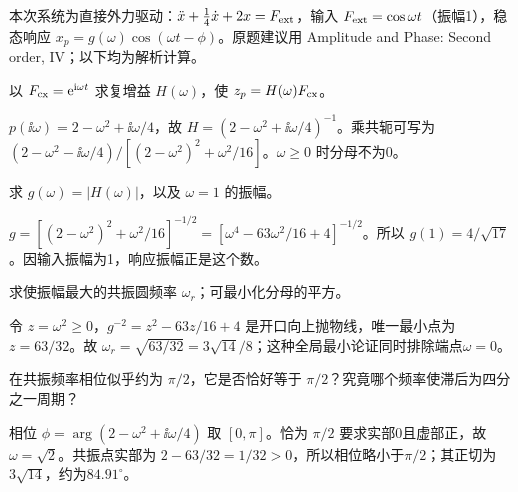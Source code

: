 本次系统为直接外力驱动：$\ddot x+\frac14\dot x+2x=F_{\rm ext}$，输入 $F_{\rm ext}=\cos\omega t$（振幅1），稳态响应 $x_p=g(\omega)\cos(\omega t-\phi)$。原题建议用 Amplitude and Phase: Second order, IV；以下均为解析计算。
\begin{exercise}\label{cw:rec11-1}
以 $F_{\rm cx}=\mathrm e^{\mathrm i\omega t}$ 求复增益 $H(\omega)$，使 $z_p=H(\omega)F_{\rm cx}$。
\end{exercise}
\begin{solution}
$p(\ii\omega)=2-\omega^2+\ii\omega/4$，故 $H=(2-\omega^2+\ii\omega/4)^{-1}$。乘共轭可写为 $(2-\omega^2-\ii\omega/4)/[(2-\omega^2)^2+\omega^2/16]$。$\omega\ge0$ 时分母不为0。
\par{}
\end{solution}

\begin{exercise}\label{cw:rec11-2}
求 $g(\omega)=|H(\omega)|$，以及 $\omega=1$ 的振幅。
\end{exercise}
\begin{solution}
$g=[(2-\omega^2)^2+\omega^2/16]^{-1/2}=[\omega^4-63\omega^2/16+4]^{-1/2}$。所以 $g(1)=4/\sqrt{17}$。因输入振幅为1，响应振幅正是这个数。
\par{}
\end{solution}

\begin{exercise}\label{cw:rec11-3}
求使振幅最大的共振圆频率 $\omega_r$；可最小化分母的平方。
\end{exercise}
\begin{solution}
令 $z=\omega^2\ge0$，$g^{-2}=z^2-63z/16+4$ 是开口向上抛物线，唯一最小点为 $z=63/32$。故 $\omega_r=\sqrt{63/32}=3\sqrt{14}/8$；这种全局最小论证同时排除端点$\omega=0$。
\par{}
\end{solution}

\begin{exercise}\label{cw:rec11-4}
在共振频率相位似乎约为 $\pi/2$，它是否恰好等于 $\pi/2$？究竟哪个频率使滞后为四分之一周期？
\end{exercise}
\begin{solution}
相位 $\phi=\arg(2-\omega^2+\ii\omega/4)$ 取 $[0,\pi]$。恰为 $\pi/2$ 要求实部0且虚部正，故 $\omega=\sqrt2$。共振点实部为 $2-63/32=1/32>0$，所以相位略小于$\pi/2$；其正切为 $3\sqrt{14}$，约为$84.91^\circ$。
\par{}
\end{solution}


